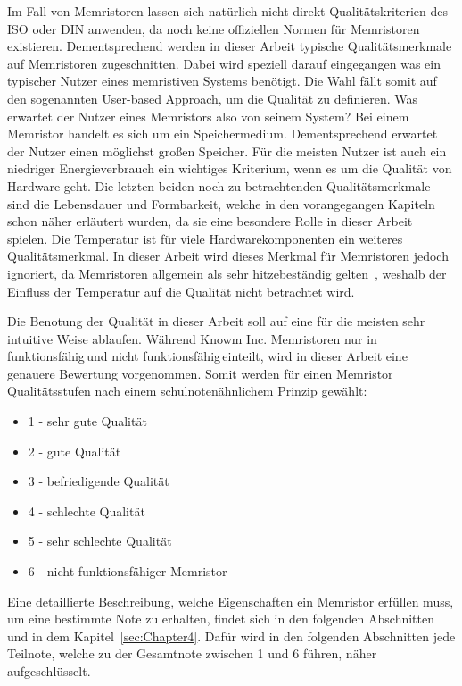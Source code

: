   Im Fall von Memristoren lassen sich natürlich nicht direkt Qualitätskriterien des ISO oder DIN anwenden, da noch keine offiziellen Normen für Memristoren existieren. Dementsprechend werden in dieser Arbeit typische Qualitätsmerkmale auf Memristoren zugeschnitten. Dabei wird speziell darauf eingegangen was ein typischer Nutzer eines memristiven Systems benötigt. Die Wahl fällt somit auf den sogenannten \glqq User-based Approach\grqq, um die Qualität zu definieren. Was erwartet der Nutzer eines Memristors also von seinem System? Bei einem Memristor handelt es sich um ein Speichermedium. Dementsprechend erwartet der Nutzer einen möglichst großen Speicher. Für die meisten Nutzer ist auch ein niedriger Energieverbrauch ein wichtiges Kriterium, wenn es um die Qualität von Hardware geht. Die letzten beiden noch zu betrachtenden Qualitätsmerkmale sind die Lebensdauer und Formbarkeit, welche in den vorangegangen Kapiteln schon näher erläutert wurden, da sie eine besondere Rolle in dieser Arbeit spielen. Die Temperatur ist für viele Hardwarekomponenten ein weiteres Qualitätsmerkmal. In dieser Arbeit wird dieses Merkmal für Memristoren jedoch ignoriert, da Memristoren allgemein als sehr hitzebeständig gelten~\cite{vde_memristor}, weshalb der Einfluss der Temperatur auf die Qualität nicht betrachtet wird.

  Die Benotung der Qualität in dieser Arbeit soll auf eine für die meisten sehr intuitive Weise ablaufen. Während Knowm Inc. Memristoren nur in \glqq funktionsfähig\grqq\,und \glqq nicht funktionsfähig\grqq\,einteilt, wird in dieser Arbeit eine genauere Bewertung vorgenommen. Somit werden für einen Memristor Qualitätsstufen nach einem schulnotenähnlichem Prinzip gewählt:
  \begin{itemize}
    \item[] 1 - sehr gute Qualität
    \item[] 2 - gute Qualität
    \item[] 3 - befriedigende Qualität
    \item[] 4 - schlechte Qualität
    \item[] 5 - sehr schlechte Qualität
    \item[] 6 - nicht funktionsfähiger Memristor
  \end{itemize}
  Eine detaillierte Beschreibung, welche Eigenschaften ein Memristor erfüllen muss, um eine bestimmte Note zu erhalten, findet sich in den folgenden Abschnitten und in dem Kapitel~\ref{sec:Chapter4}. Dafür wird in den folgenden Abschnitten jede Teilnote, welche zu der Gesamtnote zwischen 1 und 6 führen, näher aufgeschlüsselt.

